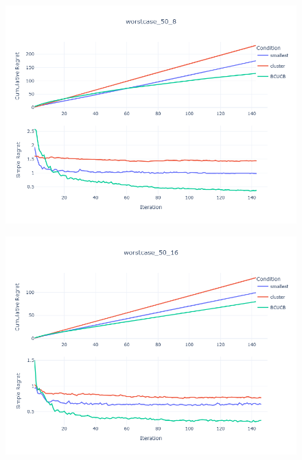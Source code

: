 \documentclass[opre,sglanonrev]{informs4}
\begin{document}
\begin{figure}[htbp]
\begin{minipage}[t]{0.48\textwidth}
        \includegraphics[width=\textwidth]{figures/worst_50_8.png}
        \label{}
    \end{minipage}
    \hfill
    \begin{minipage}[t]{0.48\textwidth}
        \centering
        \includegraphics[width=\textwidth]{figures/worst_50_16.png}
        \label{}
    \end{minipage}
    \begin{minipage}[t]{0.48\textwidth}
        \centering

\end{minipage}
\end{figure}
\end{document}
